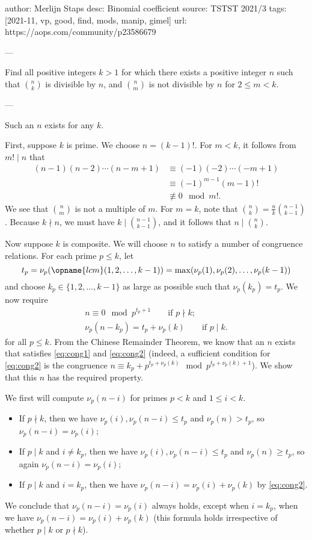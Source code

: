 author: Merlijn Staps
desc: Binomial coefficient
source: TSTST 2021/3
tags: [2021-11, vp, good, find, mods, manip, gimel]
url: https://aops.com/community/p23586679

---

Find all positive integers $k > 1$ for which there exists a positive integer
$n$ such that $\binom{n}{k}$ is divisible by $n$, and $\binom{n}{m}$ is not
divisible by $n$ for $2\leq m < k$.

---

Such an $n$ exists for any $k$.

First,  suppose $k$ is prime.  We choose $n=(k-1)!$. For
$m<k$,  it follows from $m! \mid n$ that
\begin{align*}
  (n-1)(n-2) \dotsm (n-m+1) &\equiv (-1)(-2) \dotsm (-m+1) \\
  &\equiv (-1)^{m-1} (m-1)! \\
  &\not\equiv 0 \mod m!.
\end{align*}
We see that $\binom{n}{m}$ is not a multiple of $m$.  For $m=k$, note that
$\binom{n}{k} = \frac{n}{k} \binom{n-1}{k-1}$.  Because $k \nmid n$, we must
have $k \mid \binom{n-1}{k-1}$,  and it follows that $n \mid \binom{n}{k}$.

Now suppose $k$ is composite.
We will choose $n$ to satisfy a number of congruence relations.  For each prime $p \le k$,  let
\[t_p = \nu_p(\opname{lcm}(1,2,\dots,k-1)) = \max(\nu_p(1), \nu_p(2),\dots,\nu_p(k-1))\]
and choose $k_p \in \{1,2,\dots,k-1\}$ as large as possible such that $\nu_p(k_p)=t_p$.  We now require
\begin{align}
n \equiv 0 \mod p^{t_p+1} \qquad \mbox{if $p \nmid k$}; \label{eq:cong1}\\
\nu_p(n - k_p) = t_p+\nu_p(k) \qquad \mbox{if $p \mid k$}. \label{eq:cong2}
\end{align}
for all $p \le k$.  From the Chinese Remainder Theorem,  we know that an $n$ exists that satisfies \eqref{eq:cong1} and \eqref{eq:cong2} (indeed, a sufficient condition for \eqref{eq:cong2} is the congruence $n \equiv k_p + p^{t_p+\nu_p(k)} \mod p^{t_p+\nu_p(k)+1}$).  We show that this $n$ has the required property.

We first will compute $\nu_p(n-i)$ for primes $p<k$ and $1 \le i < k$.
\begin{itemize}
\item If $p \nmid k$, then we have $\nu_p(i), \nu_p(n-i) \le t_p$ and $\nu_p(n) > t_p$, so $\nu_p(n-i) = \nu_p(i)$;
\item If $p \mid k$ and $i \neq k_p$, then we have $\nu_p(i), \nu_p(n-i) \le t_p$ and $\nu_p(n) \ge t_p$, so again $\nu_p(n-i) = \nu_p(i)$;
\item If $p \mid k$ and $i = k_p$, then we have $\nu_p(n-i) = \nu_p(i) + \nu_p(k)$ by \eqref{eq:cong2}.
\end{itemize}
We conclude that $\nu_p(n-i) = \nu_p(i)$ always holds, except when $i = k_p$, when we have $\nu_p(n-i) = \nu_p(i) + \nu_p(k)$ (this formula holds irrespective of whether $p \mid k$ or $p \nmid k$).

